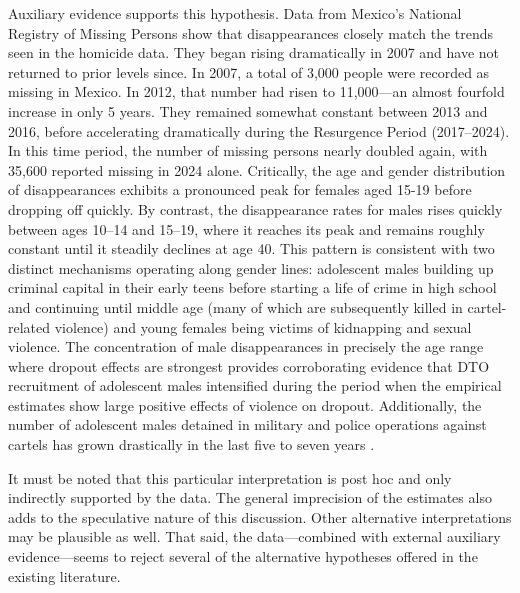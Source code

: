 \documentclass[12pt,letter,english,intoc,bibliography=totoc,index=totoc,BCOR10mm,captions=tableheading,nottitlepage,fleqn]{article}
\theoremstyle{break}
\begin{document}
Auxiliary evidence supports this hypothesis.  Data from Mexico's National Registry of Missing Persons show that disappearances closely match the trends seen in the homicide data. They began rising dramatically in 2007 and have not returned to prior levels since. In 2007, a total of 3,000 people were recorded as missing in Mexico. In 2012, that number had risen to 11,000---an almost fourfold increase in only 5 years. They remained somewhat constant between 2013 and 2016, before accelerating dramatically during the Resurgence Period (2017--2024). In this time period, the number of missing persons nearly doubled again, with 35,600 reported missing in 2024 alone. Critically, the age and gender distribution of disappearances exhibits a pronounced peak for females aged 15-19 before dropping off quickly. By contrast, the disappearance rates for males rises quickly between ages 10--14 and 15--19, where it reaches its peak and remains roughly constant until it steadily declines at age 40. This pattern is consistent with two distinct mechanisms operating along gender lines: adolescent males building up criminal capital in their early teens before starting a life of crime in high school and continuing until middle age (many of which are subsequently killed in cartel-related violence) and young females being victims of kidnapping and sexual violence. The concentration of male disappearances in precisely the age range where dropout effects are strongest provides corroborating evidence that DTO recruitment of adolescent males intensified during the period when the empirical estimates show large positive effects of violence on dropout. Additionally, the number of adolescent males detained in military and police operations against cartels has grown drastically in the last five to seven years \citep{redim2011}. 

It must be noted that this particular interpretation is post hoc and only indirectly supported by the data. The general imprecision of the estimates also adds to the speculative nature of this discussion. Other alternative interpretations may be plausible as well. That said, the data---combined with external auxiliary evidence---seems to reject several of the alternative hypotheses offered in the existing literature. 
\end{document}
